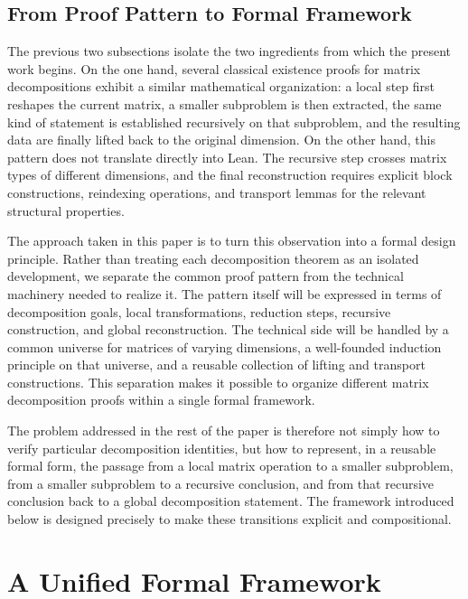 \documentclass[pdflatex,sn-mathphys-num]{sn-jnl}%
\theoremstyle{thmstyleone}%
\theoremstyle{thmstyletwo}%
\theoremstyle{thmstylethree}%
\begin{document}
\subsection{From Proof Pattern to Formal Framework}

The previous two subsections isolate the two ingredients from which the present work begins. On the one hand, several classical existence proofs for matrix decompositions exhibit a similar mathematical organization: a local step first reshapes the current matrix, a smaller subproblem is then extracted, the same kind of statement is established recursively on that subproblem, and the resulting data are finally lifted back to the original dimension. On the other hand, this pattern does not translate directly into Lean. The recursive step crosses matrix types of different dimensions, and the final reconstruction requires explicit block constructions, reindexing operations, and transport lemmas for the relevant structural properties.

The approach taken in this paper is to turn this observation into a formal design principle. Rather than treating each decomposition theorem as an isolated development, we separate the common proof pattern from the technical machinery needed to realize it. The pattern itself will be expressed in terms of decomposition goals, local transformations, reduction steps, recursive construction, and global reconstruction. The technical side will be handled by a common universe for matrices of varying dimensions, a well-founded induction principle on that universe, and a reusable collection of lifting and transport constructions. This separation makes it possible to organize different matrix decomposition proofs within a single formal framework.

The problem addressed in the rest of the paper is therefore not simply how to verify particular decomposition identities, but how to represent, in a reusable formal form, the passage from a local matrix operation to a smaller subproblem, from a smaller subproblem to a recursive conclusion, and from that recursive conclusion back to a global decomposition statement. The framework introduced below is designed precisely to make these transitions explicit and compositional.


\section{A Unified Formal Framework}
\label{sec:framework}
\end{document}
